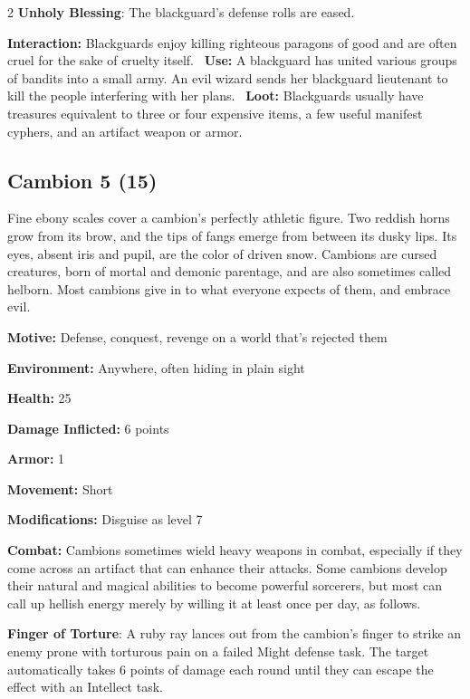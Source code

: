 \begin{multicols}{2}
\textbf{Unholy Blessing}: The blackguard’s defense rolls are eased. 

\textbf{Interaction:} Blackguards enjoy killing righteous paragons of good and are often cruel for the sake of cruelty itself. 
\textbf{Use:} A blackguard has united various groups of bandits into a small army. An evil wizard sends her blackguard lieutenant to kill the people interfering with her plans. 
\textbf{Loot:} Blackguards usually have treasures equivalent to three or four expensive items, a few useful manifest cyphers, and an artifact weapon or armor.

\subsection{Cambion 5 (15)}

Fine ebony scales cover a cambion’s perfectly athletic figure. Two reddish horns grow from its brow, and the tips of fangs emerge from between its dusky lips. Its eyes, absent iris and pupil, are the color of driven snow. Cambions are cursed creatures, born of mortal and demonic parentage, and are also sometimes called helborn. Most cambions give in to what everyone expects of them, and embrace evil.

\textbf{Motive:} Defense, conquest, revenge on a world that’s rejected them

\textbf{Environment:} Anywhere, often hiding in plain sight

\textbf{Health:} 25

\textbf{Damage Inflicted:} 6 points

\textbf{Armor:} 1

\textbf{Movement:} Short

\textbf{Modifications:} Disguise as level 7

\textbf{Combat:} Cambions sometimes wield heavy weapons in combat, especially if they come across an artifact that can enhance their attacks. Some cambions develop their natural and magical abilities to become powerful sorcerers, but most can call up hellish energy merely by willing it at least once per day, as follows.

\textbf{Finger of Torture}: A ruby ray lances out from the cambion’s finger to strike an enemy prone with torturous pain on a failed Might defense task. The target automatically takes 6 points of damage each round until they can escape the effect with an Intellect task.


\end{multicols}
